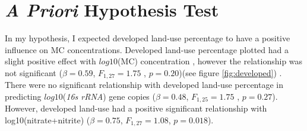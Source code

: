 


\section{\emph{A Priori} Hypothesis Test}

In my hypothesis, I expected developed land-use percentage to have a positive influence on MC concentrations. Developed land-use percentage plotted had a slight positive effect with $log10$(MC) concentration , however the relationship was not significant  ($\beta=0.59$, $F_{{1,27}}=1.75$ , $p=0.20$)(see figure \ref{fig:developed}) . There were no significant relationship with developed land-use percentage in predicting $log10$(\emph{16s rRNA}) gene copies ($\beta=0.48$, $F_{{1,25}}=1.75$ , $p=0.27$). However, developed land-use had a positive significant relationship with log10(nitrate+nitrite) ($\beta=0.75$, $F_{{1,27}}=1.08$, $p=0.018$). 

